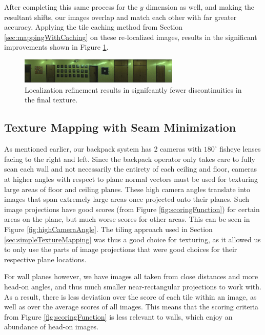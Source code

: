 \documentclass[10pt,twocolumn,letterpaper]{article}
\begin{document}
After completing this same process for the $y$ dimension as well, and
making the resultant shifts, our images overlap and
match each other with far greater accuracy. Applying the tile caching method from Section \ref{sec:mappingWithCaching} on these re-localized images, results in the significant improvements shown in Figure \ref{fig:shifted}.

\begin{figure}
  \centering
  \includegraphics[width=3in]{wall1_cache_full_shifted.jpg}
  \caption{Localization refinement results in signifcantly fewer
    discontinuities in the final texture.}
  \label{fig:shifted}
\end{figure}



\subsection{Texture Mapping with Seam Minimization}
\label{sec:seamMinimization}

As mentioned earlier, our backpack system has 2 cameras with
$180^\circ$ fisheye lenses facing to the right and left. Since the
backpack operator only takes care to fully scan each wall and not
necessarily the entirety of each ceiling and floor, cameras at higher
angles with respect to plane normal vectors must be used for texturing
large areas of floor and ceiling planes. These high camera angles
translate into images that span extremely large areas once projected
onto their planes. Such image projections have good scores (from
Figure \ref{fig:scoringFunction}) for certain areas on the plane, but
much worse scores for other areas. This can be seen in Figure
\ref{fig:highCameraAngle}. The tiling approach used in Section
\ref{sec:simpleTextureMapping} was thus a good choice for texturing,
as it allowed us to only use the parts of image projections that were
good choices for their respective plane locations.

For wall planes however, we have images all taken from close distances
and more head-on angles, and thus much smaller near-rectangular
projections to work with. As a result, there is less deviation over
the score of each tile within an image, as well as over the average
scores of all images. This means that the scoring criteria from Figure
\ref{fig:scoringFunction} is less relevant to walls, which enjoy an
abundance of head-on images.
\end{document}
